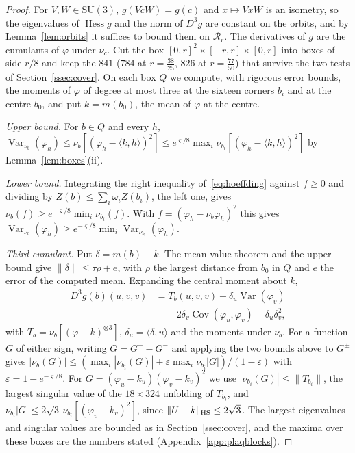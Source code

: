 \documentclass[11pt]{amsart}
\theoremstyle{definition}
\theoremstyle{remark}
\numberwithin{equation}{section}
\newcommand{\SU}{\mathrm{SU}}
\newcommand{\Hess}{\operatorname{Hess}}
\newcommand{\Cov}{\operatorname{Cov}}
\newcommand{\Var}{\operatorname{Var}}
\newcommand{\ip}[2]{\langle #1,#2\rangle}
\begin{document}
\begin{proof}
For $V,W\in\SU(3)$, $g(VcW)=g(c)$ and $x\mapsto VxW$ is an isometry, so the
eigenvalues of $\Hess g$ and the norm of $D^3g$ are constant on the orbits,
and by Lemma~\ref{lem:orbits} it suffices to bound them on $\mathcal R_r$. The
derivatives of $g$ are the cumulants of $\varphi$ under $\nu_c$. Cut the box
$[0,r]^2\times[-r,r]\times[0,r]$ into boxes of side $r/8$ and keep the $841$
($784$ at $r=\frac{38}{25}$, $826$ at $r=\frac{77}{50}$) that survive the two tests of Section~\ref{ssec:cover}. On each box $Q$ we
compute, with rigorous error bounds, the moments of $\varphi$ of degree at
most three at the sixteen corners $b_i$ and at the centre $b_0$, and put
$k=m(b_0)$, the mean of $\varphi$ at the centre.

\emph{Upper bound.} For $b\in Q$ and every $h$, $\Var_{\nu_b}(\varphi_h)\le
\nu_b[(\varphi_h-\ip kh)^2]\le e^{\varsigma/8}\max_i\nu_{b_i}[(\varphi_h-
\ip kh)^2]$ by Lemma~\ref{lem:boxes}(ii).

\emph{Lower bound.} Integrating the right inequality of~\eqref{eq:hoeffding}
against $f\ge0$ and dividing by $Z(b)\le\sum_i\omega_iZ(b_i)$, the left one,
gives $\nu_b(f)\ge
e^{-\varsigma/8}\min_i\nu_{b_i}(f)$. With $f=(\varphi_h-\nu_b\varphi_h)^2$ this
gives $\Var_{\nu_b}(\varphi_h)\ge e^{-\varsigma/8}\min_i\Var_{\nu_{b_i}}
(\varphi_h)$.

\emph{Third cumulant.} Put $\delta=m(b)-k$. The mean value theorem and the
upper bound give $\|\delta\|\le\tau\rho+e$, with $\rho$ the largest distance
from $b_0$ in $Q$ and $e$ the error of the computed mean. Expanding the
central moment about $k$,
\[
\begin{aligned}
D^3g(b)(u,v,v)&=T_b(u,v,v)-\delta_u\Var(\varphi_v)\\
&\quad-2\delta_v\Cov(\varphi_u,\varphi_v)-\delta_u\delta_v^2 ,
\end{aligned}
\]
with $T_b=\nu_b[(\varphi-k)^{\otimes3}]$, $\delta_u=\ip\delta u$ and the
moments under $\nu_b$. For a function $G$ of either sign, writing $G=G^+-G^-$
and applying the two bounds above to $G^\pm$ gives
$|\nu_b(G)|\le(\max_i|\nu_{b_i}(G)|+\varepsilon\max_i\nu_{b_i}|G|)/(1-
\varepsilon)$ with $\varepsilon=1-e^{-\varsigma/8}$. For $G=(\varphi_u-k_u)
(\varphi_v-k_v)^2$ we use $|\nu_{b_i}(G)|\le\|T_{b_i}\|$, the largest singular
value of the $18\times324$ unfolding of $T_{b_i}$, and $\nu_{b_i}|G|\le2\sqrt3
\,\nu_{b_i}[(\varphi_v-k_v)^2]$, since $\|U-k\|_{\rm HS}\le2\sqrt3$. The
largest eigenvalues and singular values are bounded as in
Section~\ref{ssec:cover}, and the maxima over these boxes are the numbers
stated (Appendix~\ref{app:plaqblocks}).
\end{proof}
\end{document}
